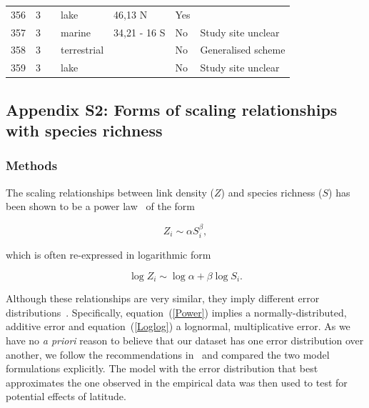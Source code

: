 \documentclass[12pt]{article}
\begin{document}
\begin{landscape}
\begin{table}[h!]
{\begin{tabular}{p{2.8cm}p{1.3cm}p{5.5cm}p{2.2cm}p{2.5cm}lp{3.5cm}}
        356   & 3 & \cite{Cohen2003}    & lake  & 46,13 N & Yes   &       \\
        357   & 3 & \cite{Yodzis1998} & marine & 34,21 - 16 S & No    & Study site unclear \\
        358   & 3 & \cite{Schroter2003}  & terrestrial &       & No    & Generalised scheme \\
        359   & 3 & \cite{Baiser2012}  & lake  &       & No    & Study site unclear \\
        \hline
      \end{tabular}%
        }
    \end{table}%

  \end{landscape}
\newpage

\subsection*{Appendix S2: Forms of scaling relationships with species richness}

  \subsubsection*{Methods}

    The scaling relationships between link density ($Z$) and species richness ($S$)
    has been shown to be a power law~\cite{Riede2010} of the form 

    \begin{equation}
    \label{Power}
    Z_{i} \sim \alpha S_{i}^{\beta}  ,
    \end{equation}

    \noindent which is often re-expressed in logarithmic form 

    \begin{equation}
    \label{Loglog}
    \log{Z_{i}} \sim \log{\alpha} + \beta\log{S_{i}}  .
    \end{equation}

    \noindent Although these relationships are very similar, they imply different error distributions~\cite{Xiao2011}.
    Specifically, equation~(\ref{Power}) implies a normally-distributed, additive 
    error and equation~(\ref{Loglog}) a lognormal,
    multiplicative error. As we have no \emph{a priori} reason to believe that our dataset 
    has one error distribution over another, we follow the recommendations in~\cite{Xiao2011} and compared the two
    model formulations explicitly. The model with the error distribution that best approximates the one
    observed in the empirical
    data was then used to test for potential effects of latitude.
\end{document}
